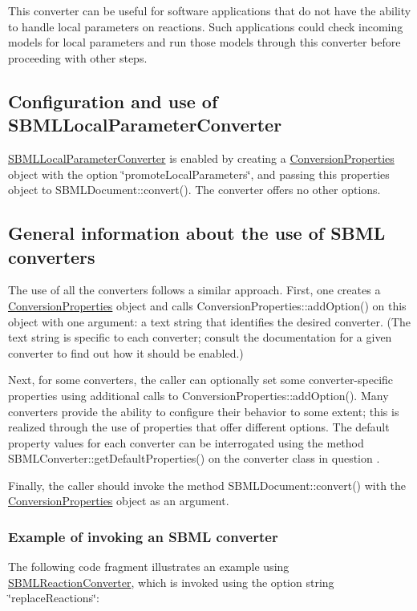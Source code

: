 This converter can be useful for software applications that do not have the ability to handle local parameters on reactions. Such applications could check incoming models for local parameters and run those models through this converter before proceeding with other steps.\hypertarget{class_s_b_m_l_local_parameter_converter_SBMLLocalParameterConverter-usage}{}\subsection{Configuration and use of S\+B\+M\+L\+Local\+Parameter\+Converter}\label{class_s_b_m_l_local_parameter_converter_SBMLLocalParameterConverter-usage}
\hyperlink{class_s_b_m_l_local_parameter_converter}{S\+B\+M\+L\+Local\+Parameter\+Converter} is enabled by creating a \hyperlink{class_conversion_properties}{Conversion\+Properties} object with the option {\ttfamily \char`\"{}promote\+Local\+Parameters\char`\"{}}, and passing this properties object to S\+B\+M\+L\+Document\+::convert(). The converter offers no other options.\hypertarget{classdoc__section__using__sbml__converters_using-converters}{}\subsection{General information about the use of S\+B\+M\+L converters}\label{classdoc__section__using__sbml__converters_using-converters}
The use of all the converters follows a similar approach. First, one creates a \hyperlink{class_conversion_properties}{Conversion\+Properties} object and calls Conversion\+Properties\+::add\+Option() on this object with one argument\+: a text string that identifies the desired converter. (The text string is specific to each converter; consult the documentation for a given converter to find out how it should be enabled.)

Next, for some converters, the caller can optionally set some converter-\/specific properties using additional calls to Conversion\+Properties\+::add\+Option(). Many converters provide the ability to configure their behavior to some extent; this is realized through the use of properties that offer different options. The default property values for each converter can be interrogated using the method S\+B\+M\+L\+Converter\+::get\+Default\+Properties() on the converter class in question .

Finally, the caller should invoke the method S\+B\+M\+L\+Document\+::convert() with the \hyperlink{class_conversion_properties}{Conversion\+Properties} object as an argument.\hypertarget{classdoc__section__using__sbml__converters_converter-example}{}\subsubsection{Example of invoking an S\+B\+M\+L converter}\label{classdoc__section__using__sbml__converters_converter-example}
The following code fragment illustrates an example using \hyperlink{class_s_b_m_l_reaction_converter}{S\+B\+M\+L\+Reaction\+Converter}, which is invoked using the option string {\ttfamily \char`\"{}replace\+Reactions\char`\"{}}\+:

